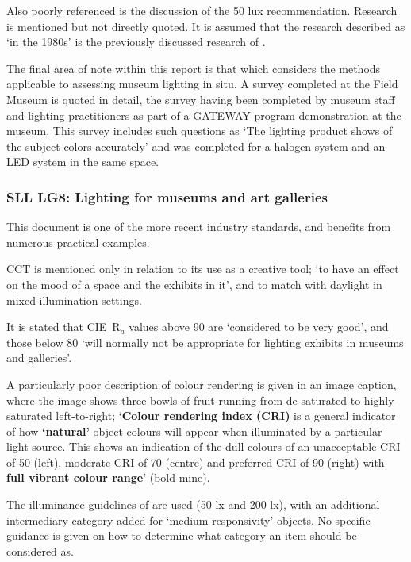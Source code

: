 Also poorly referenced is the discussion of the 50 lux recommendation. Research is mentioned but not directly quoted. It is assumed that the research described as `in the 1980s' is the previously discussed research of \citep{loe_preferred_1982}.

The final area of note within this report is that which considers the methods applicable to assessing museum lighting in situ. A survey completed at the Field Museum \citep{myer_demonstration_2010} is quoted in detail, the survey having been completed by museum staff and lighting practitioners as part of a GATEWAY program demonstration at the museum. This survey includes such questions as `The lighting product shows \underline{\hspace{2cm}} of the subject colors accurately' and was completed for a halogen system and an LED system in the same space.

\subsubsection{SLL LG8: Lighting for museums and art galleries}

This document \citep{cibse_lighting_2015} is one of the more recent industry standards, and benefits from numerous practical examples. 

\gls{CCT} is mentioned only in relation to its use as a creative tool; `to have an effect on the mood of a space and the exhibits in it', and to match with daylight in mixed illumination settings.

It is stated that \gls{CIE}~R$_a$ values above 90 are `considered to be very good', and those below 80 `will normally not be appropriate for lighting exhibits in
museums and galleries'.

A particularly poor description of colour rendering is given in an image caption, where the image shows three bowls of fruit running from de-saturated to highly saturated left-to-right; `\textbf{Colour rendering index (CRI)} is a general indicator of how \textbf{`natural'} object colours will appear when illuminated by a particular light source. This shows an indication of the dull colours of an unacceptable CRI of 50 (left), moderate CRI of 70 (centre) and preferred CRI of 90 (right) with \textbf{full vibrant colour range}' (bold mine).

The illuminance guidelines of \citet{thomson_museum_1986} are used (50 lx and 200 lx), with an additional intermediary category added for `medium responsivity' objects. No specific guidance is given on how to determine what category an item should be considered as.


